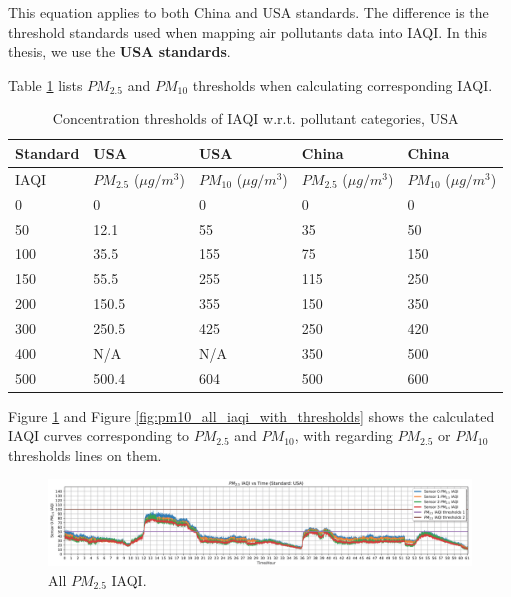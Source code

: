 This equation applies to both China and USA standards. The difference is the threshold standards used when mapping air pollutants data into IAQI. In this thesis, we use the \textbf{USA standards}.

Table \ref{table:IAQI_thresholds} lists $PM_{2.5}$ and $PM_{10}$ thresholds when calculating corresponding IAQI.

\begin{table}[!htbp]
    \centering
    \caption{Concentration thresholds of IAQI w.r.t. pollutant categories, USA}
    \label{table:IAQI_thresholds}
    \begin{tabular}{|l|l|l|l|l|}
    \hline
    Standard & USA & USA & China & China \\ \hline
    IAQI & $PM_{2.5}$ ($\mu g/m^3$) & $PM_{10}$ ($\mu g/m^3$) & $PM_{2.5}$ ($\mu g/m^3$) & $PM_{10}$ ($\mu g/m^3$) \\ \hline
    0    & 0     & 0   & 0   & 0   \\ \hline
    50   & 12.1  & 55  & 35  & 50  \\ \hline
    100  & 35.5  & 155 & 75  & 150 \\ \hline
    150  & 55.5  & 255 & 115 & 250 \\ \hline
    200  & 150.5 & 355 & 150 & 350 \\ \hline
    300  & 250.5 & 425 & 250 & 420 \\ \hline
    400  & N/A   & N/A & 350 & 500 \\ \hline
    500  & 500.4 & 604 & 500 & 600 \\ \hline
    \end{tabular}
\end{table}

Figure \ref{fig:pm25_all_iaqi_with_thresholds} and Figure \ref{fig:pm10_all_iaqi_with_thresholds} shows the calculated IAQI curves corresponding to $PM_{2.5}$ and $PM_{10}$, with regarding $PM_{2.5}$ or $PM_{10}$ thresholds lines on them.

\begin{figure}[!htbp]
    \begin{center}
        \includegraphics[width=\linewidth]{fig/iaqi/pm25_all_iaqi_with_thresholds.png}
    \end{center}
    \caption{All $PM_{2.5}$ IAQI.}
    \label{fig:pm25_all_iaqi_with_thresholds}
\end{figure}

